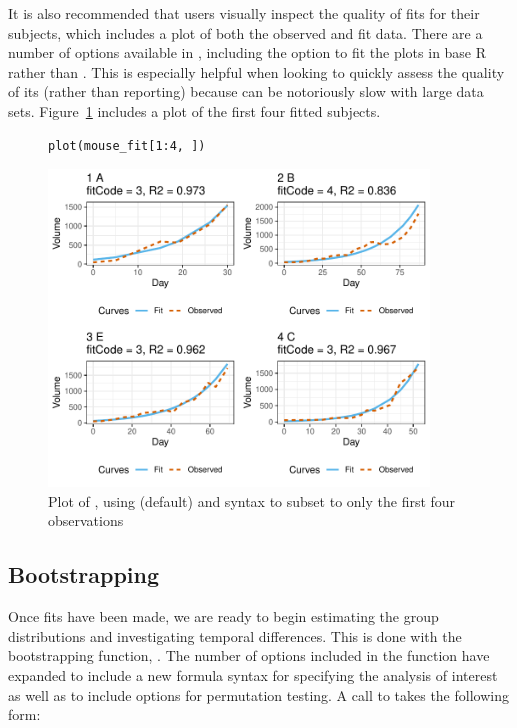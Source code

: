 It is also recommended that users visually inspect the quality of fits for their subjects, which includes a plot of both the observed and fit data. There are a number of options available in , including the option to fit the plots in base R rather than . This is especially helpful when looking to quickly assess the quality of its (rather than reporting) because  can be notoriously slow with large data sets. Figure~\ref{fig:plot_fits} includes a plot of the first four fitted subjects.


\begin{singlespace}
\begin{figure}[H]
\centering
\begin{BVerbatim}
plot(mouse_fit[1:4, ])
\end{BVerbatim}
\end{figure}
\end{singlespace}

\begin{figure}[H]
\centering
\includegraphics[width=0.9\textwidth]{img/mouse_fit.pdf}
\caption{Plot of , using   (default) and  syntax to subset to only the first four observations}
\label{fig:plot_fits}
\end{figure}

\subsection{Bootstrapping}

Once fits have been made, we are ready to begin estimating the group distributions and investigating temporal differences. This is done with the bootstrapping function, . The number of options included in the  function have expanded to include a new formula syntax for specifying the analysis of interest as well as to include options for permutation testing. A call to  takes the following form:

